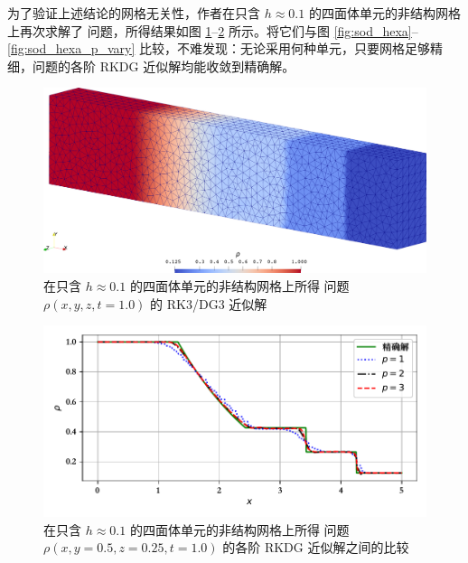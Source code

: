 为了验证上述结论的网格无关性，作者在只含 $h\approx0.1$ 的四面体单元的非结构网格上再次求解了 问题，所得结果如图
\ref{fig:sod_tetra}–\ref{fig:sod_tetra_p_vary} 所示。将它们与图 \ref{fig:sod_hexa}–\ref{fig:sod_hexa_p_vary}
比较，不难发现：无论采用何种单元，只要网格足够精细，问题的各阶
RKDG 近似解均能收敛到精确解。

\begin{figure}[h!]
\begin{centering}
\includegraphics[width=1\textwidth]{../mdpi/figures/shock_tubes/sod/contour_tetra}
\par\end{centering}
\caption{\label{fig:sod_tetra}在只含 $h\approx0.1$ 的四面体单元的非结构网格上所得 问题
$\rho(x,y,z,t=1.0)$ 的 RK3/DG3 近似解}
\end{figure}

\begin{figure}[h!]
\begin{centering}
\includegraphics[width=1\textwidth,height=0.3\textheight]{figures/shock_tubes/sod/result_tetra}
\par\end{centering}
\caption{\label{fig:sod_tetra_p_vary}在只含 $h\approx0.1$ 的四面体单元的非结构网格上所得 问题
$\rho(x,y=0.5,z=0.25,t=1.0)$ 的各阶 RKDG 近似解之间的比较}
\end{figure}

